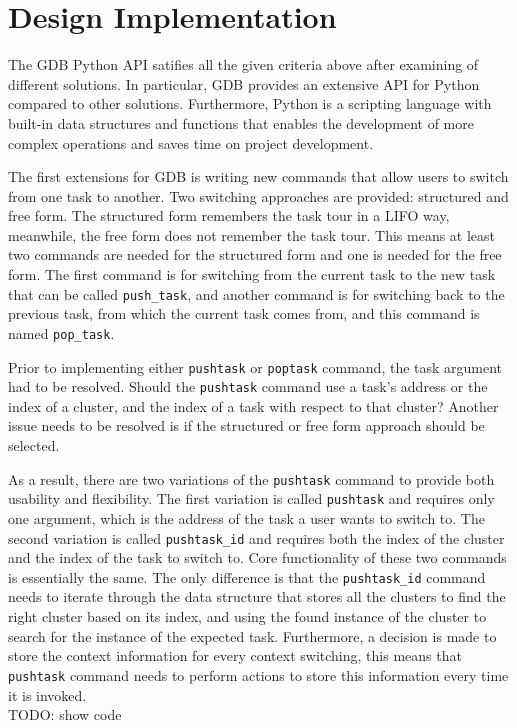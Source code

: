 \section{Design Implementation}
The GDB Python API satifies all the given criteria above after examining of different solutions. In particular, GDB provides an extensive API for
Python compared to other solutions. Furthermore, Python is a scripting language with built-in
data structures and functions that enables the development of more complex
operations and saves time on project development.

The first extensions for GDB is writing new commands that allow
users to switch from one \uCCS task to another. Two switching approaches are
provided: structured and free form. The structured form remembers the task tour in a
LIFO way, meanwhile, the free form does not remember the task tour. This means
at least two commands are needed for the structured form and one is needed for
the free form. The first command is for switching from the current task to
the new task that can be called \verb|push_task|, and another command
is for switching back to the previous task, from which the current task comes
from, and this command is named \verb|pop_task|.

Prior to implementing either \verb|pushtask| or \verb|poptask| command, the
task argument had to be resolved. Should the \verb|pushtask| command use a task's address or the index of a cluster, and the index of a task with respect
to that cluster? Another issue needs to be resolved is if the structured or free
form approach should be selected.

As a result, there are two variations of the \verb|pushtask| command to provide both usability and flexibility. The first variation is called \verb|pushtask| and requires
only one argument, which is the address of the task a user wants to switch to.
The second variation is called \verb|pushtask_id| and requires both the index of
the cluster and the index of the task to switch to. Core functionality of these two commands is
essentially the same. The only difference is that the \verb|pushtask_id| command
needs to iterate through the data structure that stores all the clusters to find
the right cluster based on its index, and using the found instance of the
cluster to search for the instance of the expected task. Furthermore, a decision
is made to store the context information for every context switching, this means
that \verb|pushtask| command needs to perform actions to store this information every time it is
invoked.
\\
TODO: show code
\\

